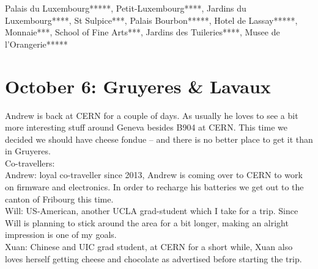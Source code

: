 Palais du Luxembourg*****, Petit-Luxembourg****, Jardins du Luxembourg****, St Sulpice***, Palais Bourbon*****, Hotel de Lassay*****, Monnaie***, School of Fine Arts***, Jardins des Tuileries****, Musee de l'Orangerie*****

\section{October 6: Gruyeres \& Lavaux}
\label{2019:Gruyeres}

Andrew is back at CERN for a couple of days. As usually he loves to see a bit more interesting stuff around Geneva besides B904 at CERN. This time we decided we should have cheese fondue -- and there is no better place to get it than in Gruyeres.\\

Co-travellers:\\
Andrew: loyal co-traveller since 2013, Andrew is coming over to CERN to work on firmware and electronics. In order to recharge his batteries we get out to the canton of Fribourg this time. \\

Will: US-American, another UCLA grad-student which I take for a trip. Since Will is planning to stick around the area for a bit longer, making an alright impression is one of my goals.\\

Xuan: Chinese and UIC grad student, at CERN for a short while, Xuan also loves herself getting cheese and chocolate as advertised before starting the trip.\\

